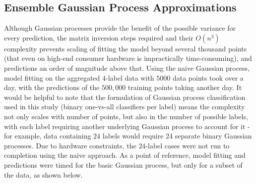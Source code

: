 


\subsection{Ensemble Gaussian Process Approximations}

Although Gaussian processes provide the benefit of the possible variance for every prediction, the matrix inversion steps required and their $O(n^3)$ complexity prevents scaling of fitting the model beyond several thousand points (that even on high-end consumer hardware is impractically time-consuming), and predictions an order of magnitude above that. Using the naive Gaussian process, model fitting on the aggregated $4$-label data with $5000$ data points took over a day, with the predictions of the $500,000$ training points taking another day. It would be helpful to note that the formulation of Gaussian process classification used in this study (binary one-vs-all classifiers per label) means the complexity not only scales with number of points, but also in the number of possible labels, with each label requiring another underlying Gaussian process to account for it - for example, data containing $24$ labels would require 24 separate binary Gaussian processes. Due to hardware constraints, the $24$-label cases were not run to completion using the naive approach. As a point of reference, model fitting and predictions were timed for the basic Gaussian process, but only for a subset of the data, as shown below.

